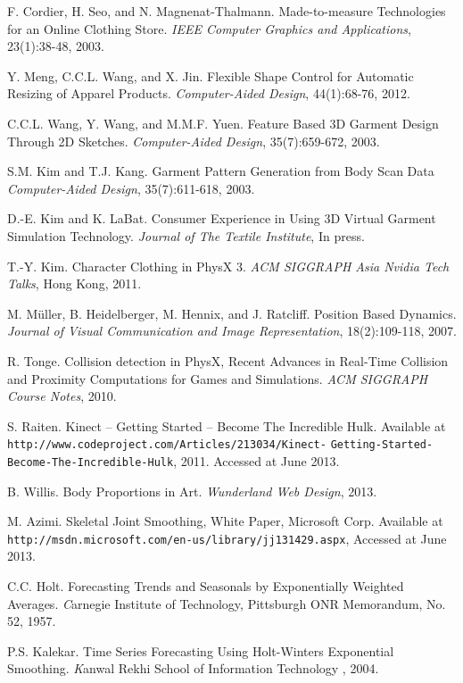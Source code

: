 \documentclass[number,preprint,review,12pt]{elsarticle}
\begin{document}
\begin{thebibliography}{}
F. Cordier, H. Seo, and N. Magnenat-Thalmann.
Made-to-measure Technologies for an Online Clothing Store. 
\textit{IEEE Computer Graphics and Applications}, 23(1):38-48, 2003. 

Y. Meng, C.C.L. Wang, and X. Jin.
Flexible Shape Control for Automatic Resizing of Apparel Products.
\textit{Computer-Aided Design}, 44(1):68-76, 2012. 
    
C.C.L. Wang, Y. Wang, and M.M.F. Yuen.
Feature Based 3D Garment Design Through 2D Sketches.
\textit{Computer-Aided Design}, 35(7):659-672, 2003. 

S.M. Kim and T.J. Kang.
Garment Pattern Generation from Body Scan Data
\textit{Computer-Aided Design}, 35(7):611-618, 2003. 

D.-E. Kim  and K. LaBat. Consumer Experience in Using 3D Virtual Garment Simulation Technology. 
\textit{Journal of The Textile Institute}, In press.

T.-Y. Kim. Character Clothing in PhysX 3. \textit{ACM SIGGRAPH Asia Nvidia Tech Talks}, Hong Kong, 2011.

M. M\"{u}ller, B. Heidelberger, M. Hennix, and J. Ratcliff. Position Based Dynamics. \textit{Journal of Visual Communication and Image Representation}, 18(2):109-118, 2007.

R. Tonge. Collision detection in PhysX, Recent Advances in Real-Time Collision and Proximity Computations for
Games and Simulations. \textit{ACM SIGGRAPH Course Notes}, 2010.

S. Raiten. Kinect -- Getting Started -- Become The Incredible Hulk. Available at \verb+http://www.codeproject.com/Articles/213034/Kinect-+ \verb+Getting-Started-Become-The-Incredible-Hulk+, 2011. Accessed at June 2013.

B. Willis. Body Proportions in Art. \textit{Wunderland Web Design}, 2013.

M. Azimi. Skeletal Joint Smoothing, White Paper, Microsoft Corp. Available at \verb+http://msdn.microsoft.com/en-us/library/jj131429.aspx+, Accessed at June 2013.

C.C. Holt. Forecasting Trends and Seasonals by Exponentially Weighted Averages. {\textit Carnegie Institute of Technology, Pittsburgh ONR Memorandum}, No. 52, 1957.

P.S. Kalekar. Time Series Forecasting Using Holt-Winters Exponential Smoothing. {\textit Kanwal Rekhi School of Information Technology}
, 2004.


\end{thebibliography}
\end{document}
